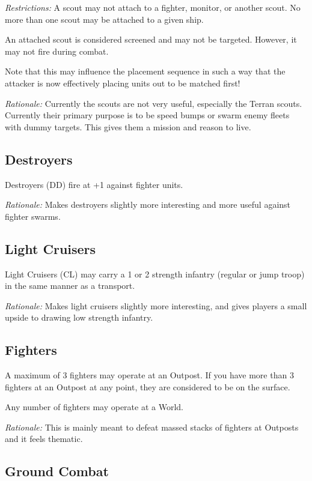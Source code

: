 \textit{Restrictions:} A scout may not attach to a fighter, monitor, or another scout. No more than one scout may be attached to a given ship.

An attached scout is considered screened and may not be targeted. However, it may not fire during combat.

Note that this may influence the placement sequence in such a way that the attacker is now effectively placing units out to be matched first!

\textit{Rationale:} Currently the scouts are not very useful, especially the Terran scouts. Currently their primary purpose is to be speed bumps or swarm enemy fleets with dummy targets. This gives them a mission and reason to live.

\subsection{Destroyers}

Destroyers (DD) fire at +1 against fighter units.

\textit{Rationale:} Makes destroyers slightly more interesting and more useful against fighter swarms.

\subsection{Light Cruisers}

Light Cruisers (CL) may carry a 1 or 2 strength infantry (regular or jump troop) in the same manner as a transport.

\textit{Rationale:} Makes light cruisers slightly more interesting, and gives players a small upside to drawing low strength infantry.

\subsection{Fighters}

A maximum of 3 fighters may operate at an Outpost. If you have more than 3 fighters at an Outpost at any point, they are considered to be on the surface.

Any number of fighters may operate at a World.

\textit{Rationale:} This is mainly meant to defeat massed stacks of fighters at Outposts and it feels thematic.

\subsection{Ground Combat}

